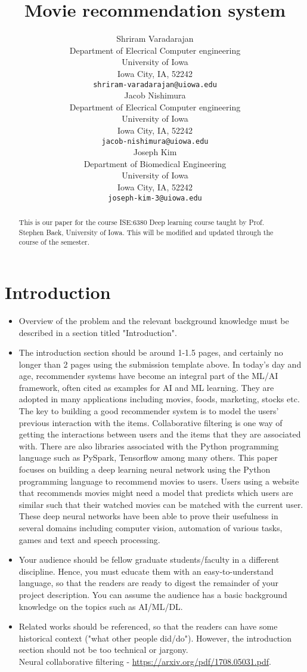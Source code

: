 \documentclass{article}
\title{Movie recommendation system}
\author{
  Shriram Varadarajan \\
  Department of Elecrical Computer engineering\\
  University of Iowa\\
  Iowa City, IA, 52242 \\
  \texttt{shriram-varadarajan@uiowa.edu} \\
   \And
 Jacob Nishimura \\
  Department of Elecrical Computer engineering\\
  University of Iowa\\
  Iowa City, IA, 52242 \\
  \texttt{jacob-nishimura@uiowa.edu} \\
\And
Joseph Kim \\
  Department of Biomedical Engineering\\
  University of Iowa\\
  Iowa City, IA, 52242 \\
  \texttt{joseph-kim-3@uiowa.edu} \\
}
\begin{document}
\maketitle

\begin{abstract}
This is our paper for the course ISE:6380 Deep learning course taught by Prof. Stephen Baek, University of Iowa. This will be modified and updated through the course of the semester. 
\end{abstract}




\section{Introduction}
\begin{itemize}
\item Overview of the problem and the relevant background knowledge must be described in a section titled "Introduction". 
\item The introduction section should be around 1-1.5 pages, and certainly no longer than 2 pages using the submission template above.
In today's day and age, recommender systems have become an integral part of the ML/AI framework, often cited as examples for AI and ML learning. They are adopted in many applications including movies, foods, marketing, stocks etc. The key to building a good recommender system is to model the users' previous
interaction with the items. Collaborative filtering is one way of getting the interactions between users and the items that they are associated with. There are also libraries associated with the Python programming language such as PySpark, Tensorflow among many others. 
This paper focuses on building a deep learning neural network using the Python programming language to recommend movies to users. 
Users using a website that recommends movies might need a model that predicts which users are similar such that their watched movies can be matched with the current user. 
These deep neural networks have been able to prove their usefulness in several domains including computer vision, automation of various tasks, games and text and speech processing.
\item Your audience should be fellow graduate students/faculty in a different discipline. Hence, you must educate them with an easy-to-understand language, so that the readers are ready to digest the remainder of your project description. You can assume the audience has a basic background knowledge on the topics such as AI/ML/DL. 
\item Related works should be referenced, so that the readers can have some historical context ("what other people did/do"). However, the introduction section should not be too technical or jargony.\\
Neural collaborative filtering - \url{https://arxiv.org/pdf/1708.05031.pdf}. \\

\end{itemize}
\end{document}
